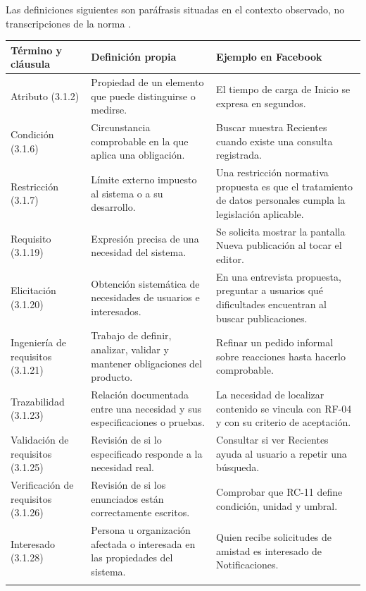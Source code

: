 \documentclass[11pt,a4paper]{article}
\newcommand{\seccion}[1]{\par\vspace{6pt}\noindent{\color{verde}\large\bfseries #1}\par\vspace{4pt}}
\begin{document}
\seccion{3. Glosario de la cláusula 3}
Las definiciones siguientes son paráfrasis situadas en el contexto observado, no transcripciones de la norma \cite{ISO29148}.
\vspace{3pt}\footnotesize
\begin{longtable}{@{}p{3.3cm}p{5.6cm}p{7.9cm}@{}}\toprule
\textbf{Término y cláusula}&\textbf{Definición propia}&\textbf{Ejemplo en Facebook}\\\midrule\endhead
Atributo (3.1.2) & Propiedad de un elemento que puede distinguirse o medirse. & El tiempo de carga de Inicio se expresa en segundos.\\\addlinespace[2pt]
Condición (3.1.6) & Circunstancia comprobable en la que aplica una obligación. & Buscar muestra Recientes cuando existe una consulta registrada.\\\addlinespace[2pt]
Restricción (3.1.7) & Límite externo impuesto al sistema o a su desarrollo. & Una restricción normativa propuesta es que el tratamiento de datos personales cumpla la legislación aplicable.\\\addlinespace[2pt]
Requisito (3.1.19) & Expresión precisa de una necesidad del sistema. & Se solicita mostrar la pantalla Nueva publicación al tocar el editor.\\\addlinespace[2pt]
Elicitación (3.1.20) & Obtención sistemática de necesidades de usuarios e interesados. & En una entrevista propuesta, preguntar a usuarios qué dificultades encuentran al buscar publicaciones.\\\addlinespace[2pt]
Ingeniería de requisitos (3.1.21) & Trabajo de definir, analizar, validar y mantener obligaciones del producto. & Refinar un pedido informal sobre reacciones hasta hacerlo comprobable.\\\addlinespace[2pt]
Trazabilidad (3.1.23) & Relación documentada entre una necesidad y sus especificaciones o pruebas. & La necesidad de localizar contenido se vincula con RF-04 y con su criterio de aceptación.\\\addlinespace[2pt]
Validación de requisitos (3.1.25) & Revisión de si lo especificado responde a la necesidad real. & Consultar si ver Recientes ayuda al usuario a repetir una búsqueda.\\\addlinespace[2pt]
Verificación de requisitos (3.1.26) & Revisión de si los enunciados están correctamente escritos. & Comprobar que RC-11 define condición, unidad y umbral.\\\addlinespace[2pt]
Interesado (3.1.28) & Persona u organización afectada o interesada en las propiedades del sistema. & Quien recibe solicitudes de amistad es interesado de Notificaciones.\\\addlinespace[2pt]
\bottomrule\end{longtable}\normalsize
\end{document}
